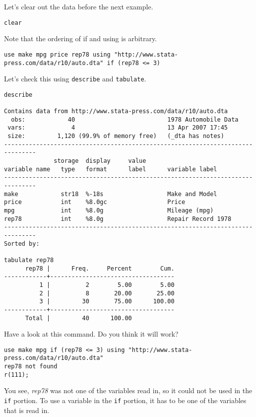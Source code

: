 Let's clear out the data before the next example.

\begin{lstlisting}
clear
\end{lstlisting}

Note that the ordering of if and using is arbitrary.

\begin{lstlisting}
use make mpg price rep78 using "http://www.stata-press.com/data/r10/auto.dta" if (rep78 <= 3)
\end{lstlisting}

Let's check this using \lstinline{describe} and \lstinline{tabulate}.

\begin{lstlisting}
describe

Contains data from http://www.stata-press.com/data/r10/auto.dta
  obs:            40                          1978 Automobile Data
 vars:             4                          13 Apr 2007 17:45
 size:         1,120 (99.9% of memory free)   (_dta has notes)
-------------------------------------------------------------------------------
              storage  display     value
variable name   type   format      label      variable label
-------------------------------------------------------------------------------
make            str18  %-18s                  Make and Model
price           int    %8.0gc                 Price
mpg             int    %8.0g                  Mileage (mpg)
rep78           int    %8.0g                  Repair Record 1978
-------------------------------------------------------------------------------
Sorted by:

tabulate rep78
      rep78 |      Freq.     Percent        Cum.
------------+-----------------------------------
          1 |          2        5.00        5.00
          2 |          8       20.00       25.00
          3 |         30       75.00      100.00
------------+-----------------------------------
      Total |         40      100.00
\end{lstlisting}

Have a look at this command. Do you think it will work?

\begin{lstlisting}
use make mpg if (rep78 <= 3) using "http://www.stata-press.com/data/r10/auto.dta"
rep78 not found
r(111);
\end{lstlisting}

You see, \textit{rep78} was not one of the variables read in, so it could not be used in the \lstinline{if} portion. To use a variable in the \lstinline{if} portion, it has to be one of the variables that is read in.

